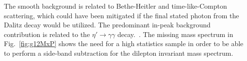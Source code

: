 	
	The smooth background is related to Bethe-Heitler and time-like-Compton scattering, which could have been mitigated if the final stated photon from the Dalitz decay would be utilized. The predominant in-peak background contribution is related to the $\eta'\rightarrow \gamma\gamma$ decay.~\cite{thesisschever}.
	The missing mass spectrum in Fig.~\ref{fig:g12MxP} shows the need for a high statistics sample in order to be able to perform a side-band subtraction for the dilepton invariant mass spectrum.
		\FloatBarrier